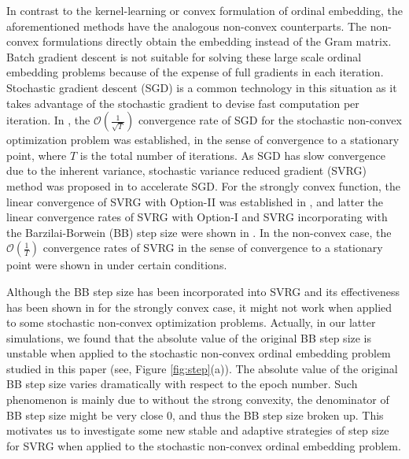 \documentclass[letterpaper]{article} %
\begin{document}
In contrast to the kernel-learning or convex formulation of ordinal embedding, the aforementioned methods have the analogous non-convex counterparts. The non-convex formulations directly obtain the embedding instead of the Gram matrix. Batch gradient descent is not suitable for solving these large scale ordinal embedding problems because of the expense of full gradients in each iteration. Stochastic gradient descent (SGD) is a common technology in this situation as it takes advantage of the stochastic gradient to devise fast computation per iteration.
In \cite{ghadimi2013stochastic}, the $\mathcal{O}(\frac{1}{\sqrt{T}})$ convergence rate of SGD for the stochastic non-convex optimization problem was established, in the sense of convergence to a stationary point, where $T$ is the total number of iterations.
As SGD has slow convergence due to the inherent variance, stochastic variance reduced gradient (SVRG) method was proposed in \cite{rie2013accelerating} to accelerate SGD.
For the strongly convex function, the linear convergence of SVRG with Option-II was established in \cite{rie2013accelerating}, and latter the linear convergence rates of SVRG with Option-I and SVRG incorporating with the Barzilai-Borwein (BB) step size were shown in \cite{NIPS2016_6286}.
In the non-convex case, the $\mathcal{O}(\frac{1}{T})$ convergence rates of SVRG in the sense of convergence to a stationary point were shown in \cite{pmlr-v48-reddi16,pmlr-v48-allen-zhua16} under certain conditions.


Although the BB step size has been incorporated into SVRG and its effectiveness has been shown in
 \cite{NIPS2016_6286} for the strongly convex case, it might not work when applied to some stochastic non-convex optimization problems.
Actually, in our latter simulations, we found that the absolute value of the original BB step size is unstable when applied to the stochastic non-convex ordinal embedding problem studied in this paper (see, Figure \ref{fig:step}(a)). The absolute value of the original BB step size varies dramatically with respect to the epoch number.
Such phenomenon is mainly due to without the strong convexity, the denominator of BB step size might be very close 0, and thus the BB step size broken up. This motivates us to investigate some new stable and adaptive strategies of step size for SVRG when applied to the stochastic non-convex ordinal embedding problem.
\end{document}
